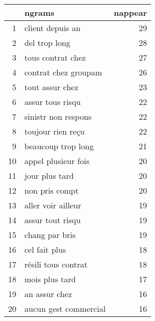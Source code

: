 \begin{tabular}{|r|l|r|}
  \hline
 & ngrams & nappear \\ 
  \hline
1 & client depuis an &  29 \\ 
  2 & del trop long &  28 \\ 
  3 & tous contrat chez &  27 \\ 
  4 & contrat chez groupam &  26 \\ 
  5 & tout assur chez &  23 \\ 
  6 & assur tous risqu &  22 \\ 
  7 & sinistr non respons &  22 \\ 
  8 & toujour rien reçu &  22 \\ 
  9 & beaucoup trop long &  21 \\ 
  10 & appel plusieur fois &  20 \\ 
  11 & jour plus tard &  20 \\ 
  12 & non pris compt &  20 \\ 
  13 & aller voir ailleur &  19 \\ 
  14 & assur tout risqu &  19 \\ 
  15 & chang par bris &  19 \\ 
  16 & cel fait plus &  18 \\ 
  17 & résili tous contrat &  18 \\ 
  18 & mois plus tard &  17 \\ 
  19 & an assur chez &  16 \\ 
  20 & aucun gest commercial &  16 \\ 
   \hline
\end{tabular}
